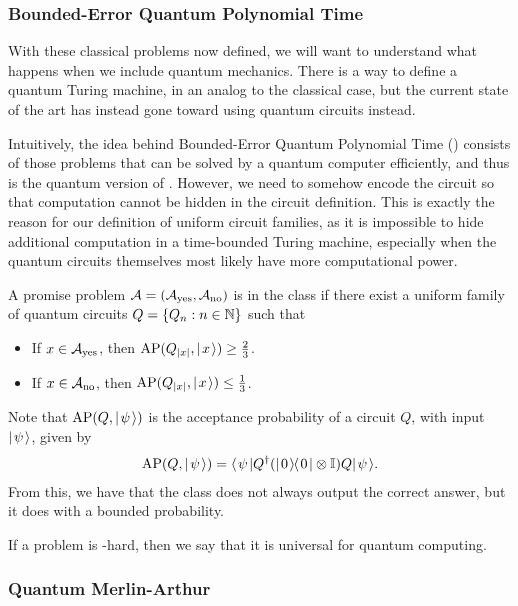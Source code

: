 \documentclass[../thesis-main/thesis-main]{subfiles}
\begin{document}
\subsubsection{Bounded-Error Quantum Polynomial Time}

With these classical problems now defined, we will want to understand what happens when we include quantum mechanics.  There is a way to define a quantum Turing machine, in an analog to the classical case, but the current state of the art has instead gone toward using quantum circuits instead.  

Intuitively, the idea behind Bounded-Error Quantum Polynomial Time (\BQP) consists of those problems that can be solved by a quantum computer efficiently, and thus is the quantum version of \PP.  However, we need to somehow encode the circuit so that computation cannot be hidden in the circuit definition.  This is exactly the reason for our definition of uniform circuit families, as it is impossible to hide additional computation in a time-bounded Turing machine, especially when the quantum circuits themselves most likely have more computational power.

\begin{definition}[\BQP] A promise problem $\mathcal{A} = (\mathcal{A}_{\text{yes}},\mathcal{A}_{\text{no}})$ is in the class \BQP{} if there exist a uniform family of quantum circuits $Q = \{Q_n: n\in \mathbb{N}\}$ such that 
  \begin{itemize}
    \item If $x\in \mathcal{A}_{\text{yes}}$, then $\operatorname{AP}(Q_{|x|},|\mspace{2mu} x \mspace{2mu} \rangle) \geq \frac{2}{3}$.
    \item If $x\in \mathcal{A}_{\text{no}}$, then $\operatorname{AP}(Q_{|x|},|\mspace{2mu} x \mspace{2mu} \rangle) \leq \frac{1}{3}$.
  \end{itemize}
\end{definition}

Note that $\operatorname{AP}(Q,|\mspace{2mu} \psi \mspace{2mu} \rangle)$ is the acceptance probability of a circuit $Q$, with input $|\mspace{2mu} \psi \mspace{2mu} \rangle$, given by
\begin{align}
  \operatorname{AP}(Q,|\mspace{2mu} \psi \mspace{2mu} \rangle)=\langle\mspace{2mu} \psi \mspace{2mu} | Q^\dag (|\mspace{2mu} 0 \mspace{2mu} \rangle\mspace{-2mu}\langle\mspace{2mu} 0 \mspace{2mu} |\otimes \mathbb{I}) Q|\mspace{2mu} \psi \mspace{2mu} \rangle.
\end{align}
From this, we have that the class \BQP{} does not always output the correct answer, but it does with a bounded probability. 

If a problem is \BQP-hard, then we say that it is universal for quantum computing.

\subsubsection{Quantum Merlin-Arthur}
\end{document}
